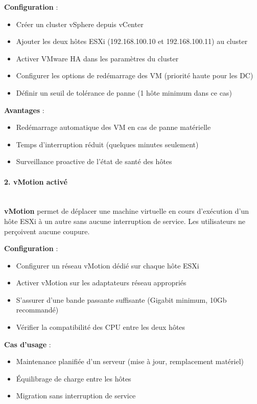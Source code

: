 \noindent \textbf{Configuration} :
\begin{itemize}
	\item Créer un cluster vSphere depuis vCenter
	\item Ajouter les deux hôtes ESXi (192.168.100.10 et 192.168.100.11) au cluster
	\item Activer VMware HA dans les paramètres du cluster
	\item Configurer les options de redémarrage des VM (priorité haute pour les DC)
	\item Définir un seuil de tolérance de panne (1 hôte minimum dans ce cas)
\end{itemize}

\noindent \textbf{Avantages} :
\begin{itemize}
	\item Redémarrage automatique des VM en cas de panne matérielle
	\item Temps d'interruption réduit (quelques minutes seulement)
	\item Surveillance proactive de l'état de santé des hôtes
\end{itemize}

\newpage

\paragraph{2. vMotion activé}

\noindent \vspace{0.5cm} \\ \textbf{vMotion} permet de déplacer une machine virtuelle en cours d'exécution d'un hôte ESXi à un autre sans aucune interruption de service. Les utilisateurs ne perçoivent aucune coupure.

\noindent \textbf{Configuration} :
\begin{itemize}
	\item Configurer un réseau vMotion dédié sur chaque hôte ESXi
	\item Activer vMotion sur les adaptateurs réseau appropriés
	\item S'assurer d'une bande passante suffisante (Gigabit minimum, 10Gb recommandé)
	\item Vérifier la compatibilité des CPU entre les deux hôtes
\end{itemize}

\noindent \textbf{Cas d'usage} :
\begin{itemize}
	\item Maintenance planifiée d'un serveur (mise à jour, remplacement matériel)
	\item Équilibrage de charge entre les hôtes
	\item Migration sans interruption de service
\end{itemize}

